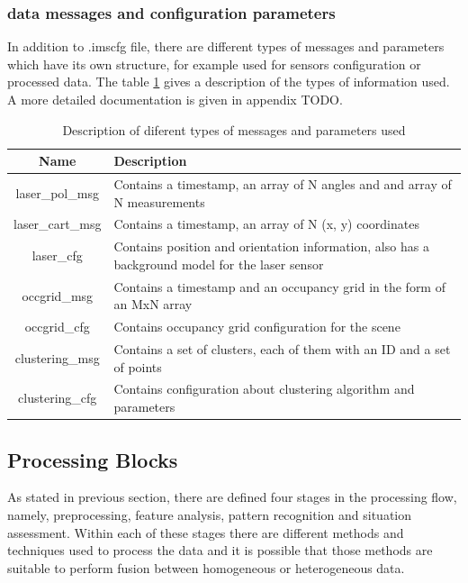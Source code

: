 \subsubsection{data messages and configuration parameters}

In addition to .imscfg file, there are different types of messages and parameters which have its own structure, for example used for sensors configuration or processed data. The table \ref{desc_map} gives a description of the types of information used. A more detailed documentation is given in appendix TODO.

\begin{table}[ht!]
\footnotesize
\centering
\begin{tabular}{|c | p{8cm}|}
\hline
\textbf{Name} & \textbf{Description} \\
\hline
laser\_pol\_msg & Contains a timestamp, an array of N angles and and array of N measurements \\
\hline
laser\_cart\_msg & Contains a timestamp, an array of N (x, y) coordinates \\
\hline
laser\_cfg & Contains position and orientation information, also has a background model for the laser sensor \\
\hline
occgrid\_msg & Contains a timestamp and an occupancy grid in the form of an MxN array \\
\hline
occgrid\_cfg & Contains occupancy grid configuration for the scene \\
\hline
clustering\_msg & Contains a set of clusters, each of them with an ID and a set of points \\
\hline
clustering\_cfg & Contains configuration about clustering algorithm and parameters \\
\hline
\end{tabular}
\caption{Description of diferent types of messages and parameters used}
\label{desc_map}
\end{table}



\subsection{Processing Blocks} \label{proc_blocks}

As stated in previous section, there are defined four stages in the processing flow, namely, preprocessing, feature analysis, pattern recognition and situation assessment. Within each of these stages there are different methods and techniques used to process the data and it is possible that those methods are suitable to perform fusion between homogeneous or heterogeneous data.

